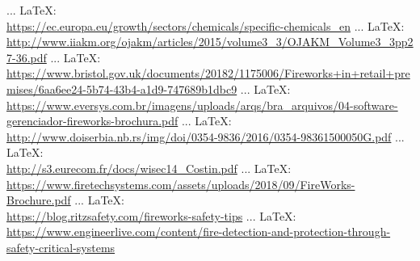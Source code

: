 \begin{thebibliography}{99}
{{{	 ... \LaTeX:\\ \url{https://ec.europa.eu/growth/sectors/chemicals/specific-chemicals_en}
	 ... \LaTeX:\\ \url{http://www.iiakm.org/ojakm/articles/2015/volume3_3/OJAKM_Volume3_3pp27-36.pdf}
	 ... \LaTeX:\\ \url{https://www.bristol.gov.uk/documents/20182/1175006/Fireworks+in+retail+premises/6aa6ee24-5b74-43b4-a1d9-747689b1dbc9}
	 ... \LaTeX:\\ \url{https://www.eversys.com.br/imagens/uploads/arqs/bra_arquivos/04-software-gerenciador-fireworks-brochura.pdf}
	 ... \LaTeX:\\ \url{http://www.doiserbia.nb.rs/img/doi/0354-9836/2016/0354-98361500050G.pdf}
	 ... \LaTeX:\\ \url{http://s3.eurecom.fr/docs/wisec14_Costin.pdf}
	 ... \LaTeX:\\ \url{https://www.firetechsystems.com/assets/uploads/2018/09/FireWorks-Brochure.pdf}
	 ... \LaTeX:\\ \url{https://blog.ritzsafety.com/fireworks-safety-tips}
	 ... \LaTeX:\\ \url{https://www.engineerlive.com/content/fire-detection-and-protection-through-safety-critical-systems}
%    
}}}
\end{thebibliography}
